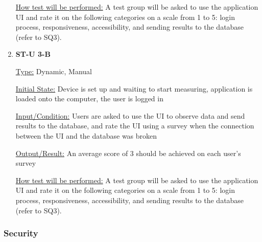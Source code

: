 \documentclass[12pt, titlepage]{article}
\begin{document}
\begin{enumerate}
\underline{How test will be performed:} A test group will be asked to use the application UI and rate it on the following categories on a scale from 1 to 5: login process, responsiveness, accessibility, and sending results to the database (refer to SQ3).
\newpage
\item{\bf{ST-U 3-B}}

\underline{Type:} Dynamic, Manual
					
\underline{Initial State:} Device is set up and waiting to start measuring, application is loaded onto the computer, the user is logged in
					
\underline{Input/Condition:} Users are asked to use the UI to observe data and send results to the database, and rate the UI using a survey when the connection between the UI and the database was broken
					
\underline{Output/Result:} An average score of 3 should be achieved on each user's survey
					
\underline{How test will be performed:} A test group will be asked to use the application UI and rate it on the following categories on a scale from 1 to 5: login process, responsiveness, accessibility, and sending results to the database (refer to SQ3).

					
					
					
					

\end{enumerate}

\subsubsection{Security}
\end{document}
